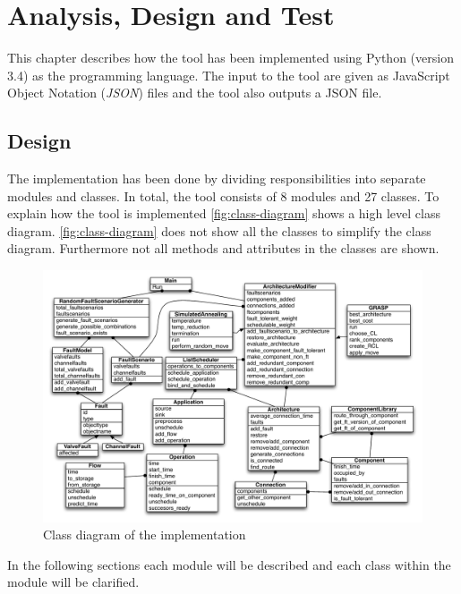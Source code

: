 \chapter{Analysis, Design and Test}
This chapter describes how the tool has been implemented using Python (version 3.4) as the programming language. The input to the tool are given as JavaScript Object Notation (\emph{JSON}) files and the tool also outputs a JSON file.

\section{Design}
The implementation has been done by dividing responsibilities into separate modules and classes. In total, the tool consists of 8 modules and 27 classes. To explain how the tool is implemented \autoref{fig:class-diagram} shows a high level class diagram. \autoref{fig:class-diagram} does not show all the classes to simplify the class diagram. Furthermore not all methods and attributes in the classes are shown.

\begin{figure}
\centering
\includegraphics[scale=0.425]{figures/ClassDiagram.pdf}
\caption[Class diagram of the implementation]{Class diagram of the implementation}
\label{fig:class-diagram}
\end{figure}

In the following sections each module will be described and each class within the module will be clarified.

